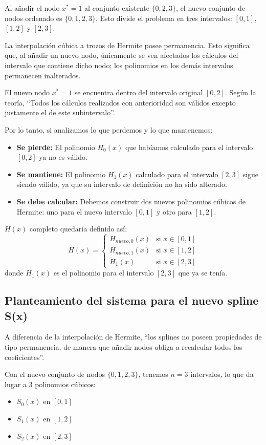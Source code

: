 \documentclass{article}
\begin{document}
Al añadir el nodo $x^*=1$ al conjunto existente $\{0, 2, 3\}$, el nuevo conjunto de nodos ordenado es $\{0, 1, 2, 3\}$. Esto divide el problema en tres intervalos: $[0,1]$, $[1,2]$ y $[2,3]$.

La interpolación cúbica a trozos de Hermite posee permanencia. Esto significa que, al añadir un nuevo nodo, únicamente se ven afectados los cálculos del intervalo que contiene dicho nodo; los polinomios en los demás intervalos permanecen inalterados.

El nuevo nodo $x^*=1$ se encuentra dentro del intervalo original $[0,2]$. Según la teoría, ``Todos los cálculos realizados con anterioridad son válidos excepto justamente el de este subintervalo''.

Por lo tanto, si analizamos lo que perdemos y lo que mantenemos:
\begin{itemize}
    \item \textbf{Se pierde:} El polinomio $H_0(x)$ que habíamos calculado para el intervalo $[0,2]$ ya no es válido.
    \item \textbf{Se mantiene:} El polinomio $H_1(x)$ calculado para el intervalo $[2,3]$ sigue siendo válido, ya que su intervalo de definición no ha sido alterado.
    \item \textbf{Se debe calcular:} Debemos construir dos nuevos polinomios cúbicos de Hermite: uno para el nuevo intervalo $[0,1]$ y otro para $[1,2]$.
\end{itemize}

$H(x)$ completo quedaría definido así:
$$ H(x) = \begin{cases} H_{nuevo,0}(x) & \text{si } x \in [0,1] \\ H_{nuevo,1}(x) & \text{si } x \in [1,2] \\ H_1(x) & \text{si } x \in [2,3] \end{cases} $$
donde $H_1(x)$ es el polinomio para el intervalo $[2,3]$ que ya se tenía.


\subsection{Planteamiento del sistema para el nuevo spline S(x)}

A diferencia de la interpolación de Hermite, ``los splines no poseen propiedades de tipo permanencia, de manera que añadir nodos obliga a recalcular todos los coeficientes''.

Con el nuevo conjunto de nodos $\{0, 1, 2, 3\}$, tenemos $n=3$ intervalos, lo que da lugar a 3 polinomios cúbicos:
\begin{itemize}
    \item $S_0(x)$ en $[0,1]$
    \item $S_1(x)$ en $[1,2]$
    \item $S_2(x)$ en $[2,3]$
\end{itemize}
\end{document}
